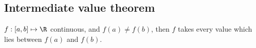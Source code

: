 







\subsection{Intermediate value theorem}

\begin{theorem}\label{thm:intermediate_value}
$f:[a,b]\mapsto \R$ continuous, and $f(a)\neq f(b)$, then $f$ takes every value which lies between $f(a)$ and $f(b)$.
\end{theorem}

